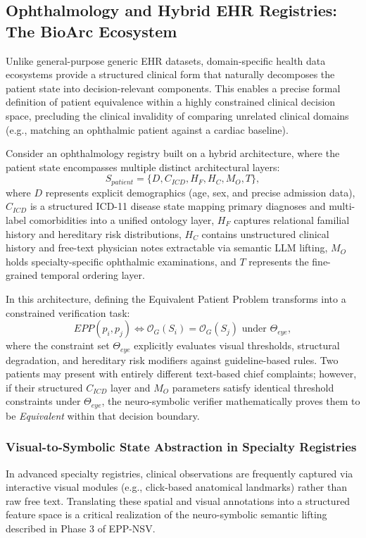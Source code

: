 \documentclass[english,5p,twocolumn,preprint]{elsarticle}
\newcommand{\Obs}{\mathcal{O}}
\begin{document}
\subsection{Ophthalmology and Hybrid EHR Registries: The BioArc Ecosystem}
Unlike general-purpose generic EHR datasets, domain-specific health data ecosystems provide a structured clinical form that naturally decomposes the patient state into decision-relevant components. This enables a precise formal definition of patient equivalence within a highly constrained clinical decision space, precluding the clinical invalidity of comparing unrelated clinical domains (e.g., matching an ophthalmic patient against a cardiac baseline). 

Consider an ophthalmology registry built on a hybrid architecture, where the patient state encompasses multiple distinct architectural layers:
\begin{equation}
    S_{patient} = \{D, C_{ICD}, H_F, H_C, M_O, T\},
\end{equation}
where $D$ represents explicit demographics (age, sex, and precise admission data), $C_{ICD}$ is a structured ICD-11 disease state mapping primary diagnoses and multi-label comorbidities into a unified ontology layer, $H_F$ captures relational familial history and hereditary risk distributions, $H_C$ contains unstructured clinical history and free-text physician notes extractable via semantic LLM lifting, $M_O$ holds specialty-specific ophthalmic examinations, and $T$ represents the fine-grained temporal ordering layer.

In this architecture, defining the Equivalent Patient Problem transforms into a constrained verification task:
\begin{equation}
    EPP(p_i, p_j) \iff \Obs_G(S_i) = \Obs_G(S_j) \text{ under } \Theta_{eye},
\end{equation}
where the constraint set $\Theta_{eye}$ explicitly evaluates visual thresholds, structural degradation, and hereditary risk modifiers against guideline-based rules. Two patients may present with entirely different text-based chief complaints; however, if their structured $C_{ICD}$ layer and $M_O$ parameters satisfy identical threshold constraints under $\Theta_{eye}$, the neuro-symbolic verifier mathematically proves them to be \emph{Equivalent} within that decision boundary.

\subsubsection{Visual-to-Symbolic State Abstraction in Specialty Registries}
In advanced specialty registries, clinical observations are frequently captured via interactive visual modules (e.g., click-based anatomical landmarks) rather than raw free text. Translating these spatial and visual annotations into a structured feature space is a critical realization of the neuro-symbolic semantic lifting described in Phase 3 of EPP-NSV.
\end{document}
